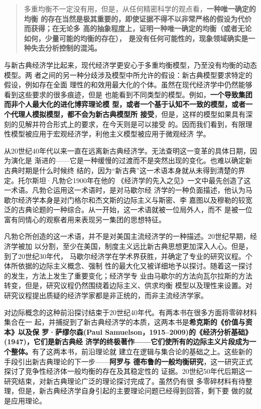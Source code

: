 \begin{quotation}
  多重均衡不一定没有用，但是，从任何精密科学的观点看，\textbf{一种唯一确定的均衡
    的存在当然是极其重要的，即使证据不得不以非常严格的假设为代价而获得；在无论多
    高的抽象程度上，证明一种唯一确定的均衡（或者无论如何，少量可能的均衡的存在），
    是没有任何可能性的，现象领域确实是一种失去分析控制的混沌。}
\end{quotation}

与新古典经济学比起来，现代经济学更安心于多重均衡模型，乃至没有均衡的动态模型。两
者之间的另一种分歧涉及模型中所允许的假设：新古典模型要求特定的假设，例如存在全面
理性的和效用最大化的个体。虽然在现代经济学中仍然能够看到这些要求的很多痕迹，但是
也能看到不同类型的模型。例如，\textbf{一个导致集团而非个人最大化的进化博弈理论模
  型，或者一个基于认知不一致的模型，或者一个代理人模拟模型，都不会为新古典模型所
  接受}，但是，这样的模型如果具有深刻的见解并符合形式上的要求，在今天则是可以接受
的。因而我们看到，有限理性模型被应用于宏观经济学，利他主义模型被应用于微观经济
学。

从20世纪40年代以来一直在远离新古典经济学。无法查明这一变革的具体日期，因为演化是
渐进的——它是一种缓慢的过渡而不是突然出现的变化。也难以确定新古典时期是什么时候终
结的，因为“新古典”这一术语本身就从未得到清楚的界定。托尔斯坦·凡勃仑1900年在他的
《经济学的先入之见》一文中最先创造了这一术语。凡勃仑运用这一术语时，是对马歇尔经
济学的一种负面描述，他认为马歇尔经济学本身是对门格尔和杰文斯的边际主义与斯密、李
嘉图以及穆勒的较宽泛的古典论题的一种综合。从一开始，这一术语就被一位局外人，而不
是被一位富有同情心的观察者用来表现另一集团的思想特征。

凡勃仑所创造的这一术语，并不是对美国主流经济学的一种描述。20世纪早期，经济学被加
以分割，至少在美国，制度主义远比新古典思想更加深入人心。但是，到了20世纪30年代，
马歇尔经济学在学术界获胜，并确定了专业的研究议程。个体所依据的边际主义概念、强制
性的最大化又被详细地予以探讨。随着这一探讨的发生，方法上发生了重要变化；经济学专
业由马歇尔的方法向瓦尔拉斯的方法转变，但是，研究议程仍然围绕着边际主义、供求均衡
模型以及理性来设置。对研究议程提出质疑的经济学家都是非正统的，而非主流经济学家。

对边际概念的这种前沿探讨结束于20世纪40年代。有两本书在很多方面将零碎材料集合在一
起，并捕捉到了新古典经济学的本质，这两本书是\textbf{希克斯的《价值与资本》以及保
  罗·萨缪尔森(Paul Samuelson，1915--2009)的《经济分析基础》(1947)，它们是新古典经
  济学的终极著作——它们使所有的边际主义片段成为一个整体。}有了这两本书，前沿理论就
建立在逻辑与集合论的基础之上。这些新的手段引出新古典理论的下一步——\textbf{阿罗与
  德布鲁的一般均衡研究}，这一研究正式探讨了竞争性经济体一般均衡的存在及其稳定性的
证据。20世纪50年代后期这一研究结束，对新古典理论广泛的理论探讨完成了。虽然仍有很
多零碎材料有待整理，但是，新古典经济学自身引起的主要理论问题已经得到回答，剩下要
做的就是应用理论。

